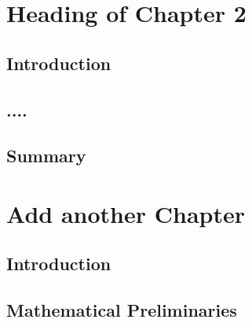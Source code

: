\documentclass[12pt]{report}
\begin{document}
\chapter{Heading of Chapter 2}

\section{Introduction}



\section{....}



\lipsum[2-4]






\section{Summary}































\chapter{Add another Chapter}

\section{Introduction}


\section{Mathematical Preliminaries}
\end{document}
